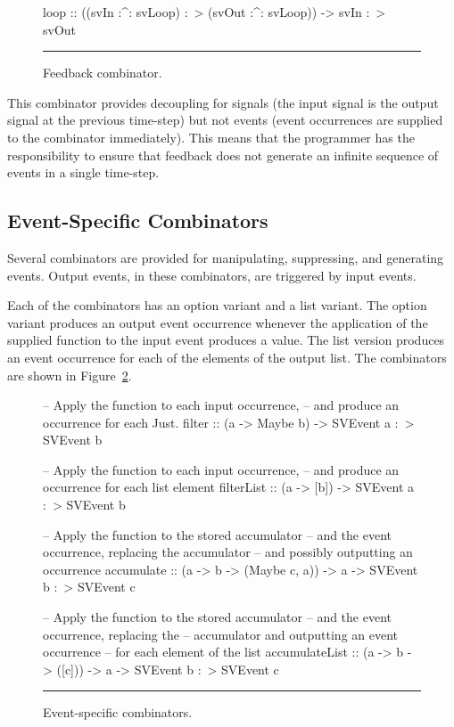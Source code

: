 \begin{figure}
\begin{code}
loop ::    ((svIn :^: svLoop) :~> (svOut :^: svLoop))
        -> svIn :~> svOut
\end{code}
\hrule
\caption{Feedback combinator.}
\label{figure:feedback_combinator}
\end{figure}

This combinator provides decoupling for signals
(the input signal is the output signal at the previous time-step)
but not events (event occurrences are supplied to the combinator immediately).
This means that the programmer has the responsibility to ensure that feedback
does not generate an infinite sequence of events in a single time-step.

\subsection{Event-Specific Combinators}
\label{subsection:System_Design_and_Interface-Combinators-Event_specific_combinators}

Several combinators are provided for manipulating, suppressing, and generating events.
Output events, in these combinators, are triggered by input events.

Each of the combinators has an option variant and a list variant. The option variant
produces an output event occurrence whenever the application of the supplied function
to the input event produces a value. The list version produces an event occurrence for
each of the elements of the output list. The combinators are shown in Figure~\ref{figure:event_specific_combinators}.

\begin{figure}
\begin{code}
-- Apply the function to each input occurrence,
-- and produce an occurrence for each Just.
filter :: (a -> Maybe b) -> SVEvent a :~> SVEvent b

-- Apply the function to each input occurrence,
-- and produce an occurrence for each list element
filterList :: (a -> [b]) -> SVEvent a :~> SVEvent b

-- Apply the function to the stored accumulator
-- and the event occurrence, replacing the accumulator
-- and possibly outputting an occurrence
accumulate ::    (a -> b -> (Maybe c, a))
              -> a
              -> SVEvent b :~> SVEvent c

-- Apply the function to the stored accumulator
-- and the event occurrence, replacing the
-- accumulator and outputting an event occurrence
-- for each element of the list
accumulateList ::    (a -> b -> ([c]))
                  -> a
                  -> SVEvent b :~> SVEvent c
\end{code}
\hrule
\caption{Event-specific combinators.}
\label{figure:event_specific_combinators}
\end{figure}

